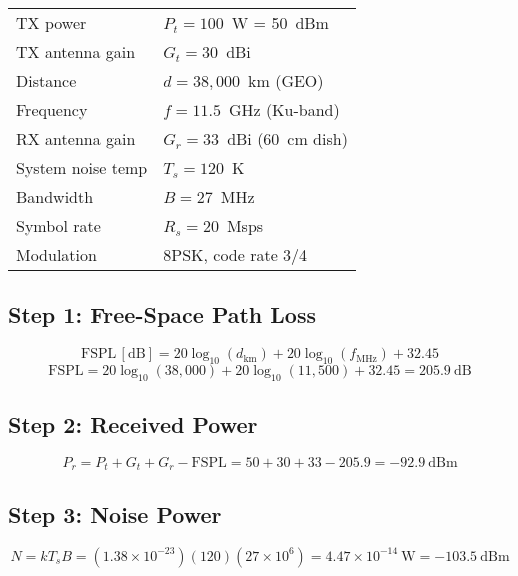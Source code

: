 \begin{center}
\begin{tabular}{@{}ll@{}}
TX power & $P_t = 100$~W = 50~dBm \\
TX antenna gain & $G_t = 30$~dBi \\
Distance & $d = 38{,}000$~km (GEO) \\
Frequency & $f = 11.5$~GHz (Ku-band) \\
RX antenna gain & $G_r = 33$~dBi (60~cm dish) \\
System noise temp & $T_s = 120$~K \\
Bandwidth & $B = 27$~MHz \\
Symbol rate & $R_s = 20$~Msps \\
Modulation & 8PSK, code rate 3/4 \\
\end{tabular}
\end{center}

\subsection*{Step 1: Free-Space Path Loss}

\begin{equation}
\mathrm{FSPL\,[dB]} = 20\log_{10}(d_{\text{km}}) + 20\log_{10}(f_{\text{MHz}}) + 32.45
\end{equation}
\begin{equation}
\mathrm{FSPL} = 20\log_{10}(38{,}000) + 20\log_{10}(11{,}500) + 32.45 = 205.9~\text{dB}
\end{equation}

\subsection*{Step 2: Received Power}

\begin{equation}
P_r = P_t + G_t + G_r - \mathrm{FSPL} = 50 + 30 + 33 - 205.9 = -92.9~\text{dBm}
\end{equation}

\subsection*{Step 3: Noise Power}

\begin{equation}
N = kT_sB = (1.38 \times 10^{-23})(120)(27 \times 10^6) = 4.47 \times 10^{-14}~\text{W} = -103.5~\text{dBm}
\end{equation}

